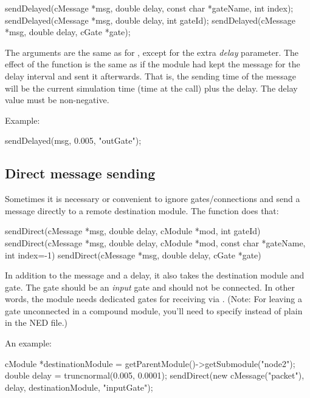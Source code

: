\begin{cpp}
sendDelayed(cMessage *msg, double delay, const char *gateName, int index);
sendDelayed(cMessage *msg, double delay, int gateId);
sendDelayed(cMessage *msg, double delay, cGate *gate);
\end{cpp}

The arguments are the same as for , except for the extra \textit{delay}
parameter. The effect of the function is the same as if the module
had kept the message for the delay interval and sent it afterwards.
That is, the sending time of the message will be the current
simulation time (time at the  call) plus the delay.
The delay value must be non-negative.

Example:

\begin{cpp}
sendDelayed(msg, 0.005, "outGate");
\end{cpp}



\subsection{Direct message sending}
\label{sec:simple-modules:direct-sending}

Sometimes it is necessary or convenient to ignore gates/connections
and send a message directly to a remote destination module. The 
function does that:

\begin{cpp}
sendDirect(cMessage *msg, double delay, cModule *mod, int gateId)
sendDirect(cMessage *msg, double delay, cModule *mod, const char *gateName, int index=-1)
sendDirect(cMessage *msg, double delay, cGate *gate)
\end{cpp}

In addition to the message and a delay, it also takes the destination module
and gate. The gate should be an \textit{input} gate and should not be connected.
In other words, the module needs dedicated gates for receiving via .
(Note: For leaving a gate unconnected in a compound module, you'll need to specify
 instead of plain  in the NED file.)

An example:

\begin{cpp}
cModule *destinationModule = getParentModule()->getSubmodule("node2");
double delay = truncnormal(0.005, 0.0001);
sendDirect(new cMessage("packet"), delay, destinationModule, "inputGate");
\end{cpp}

